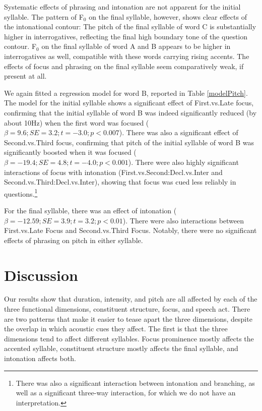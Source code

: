 \documentclass[preprint,review,12pt,authoryear,times]{elsarticle}
\begin{document}
 Systematic effects of phrasing and intonation are not apparent for the initial syllable. The pattern of F$_0$ on the final syllable, however, shows clear effects of the intonational contour: The pitch of the final syllable of word  C is substantially higher in interrogatives, reflecting the final high boundary tone of the question contour. F$_0$ on the final syllable of word A and B appears to be higher in interrogatives as well, compatible with these words carrying rising accents. The effects of focus and phrasing on the final syllable seem comparatively weak, if present at all.

We again fitted a regression model for word B, reported in Table \ref{modelPitch}. The model for the initial syllable shows a significant effect of First.vs.Late focus, confirming that the initial syllable of word B was indeed significantly reduced (by about 10Hz) when the first word was focused ($\beta=9.6; SE=3.2; t=-3.0; p<0.007$). There was also a significant effect of Second.vs.Third focus, confirming that pitch of the initial syllable of word B was significantly boosted when it was focused ($\beta=-19.4; SE=4.8; t=-4.0; p<0.001$). There were also highly significant interactions of focus with intonation (First.vs.Second:Decl.vs.Inter and Second.vs.Third:Decl.vs.Inter), showing that focus was cued less reliably in questions.\footnote{There was also a significant interaction between intonation and branching, as well as a significant three-way interaction, for which we do not have an interpretation.}



For the final syllable, there was an effect of intonation ($\beta=-12.59; SE=3.9; t=3.2; p<0.01$). There were also interactions between First.vs.Late Focus and Second.vs.Third Focus. Notably, there were no significant effects of phrasing on pitch in either syllable.


\section{Discussion}

Our results show that duration, intensity, and pitch are all affected by each of the three functional dimensions, constituent structure, focus, and speech act. %
There are two patterns that make it easier to tease apart the three dimensions, despite the overlap in which acoustic cues they affect. The first is that the three dimensions tend to affect different syllables. Focus prominence mostly affects the accented syllable, constituent structure mostly affects the final syllable, and intonation affects both. 
\end{document}
